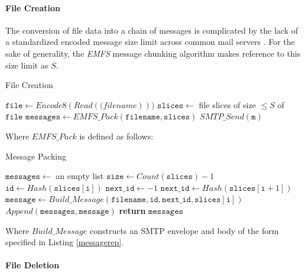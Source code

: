 \documentclass[12pt]{article}
\begin{document}
\paragraph{File Creation}

The conversion of file data into a chain of messages is complicated by the lack
of a standardized encoded message size limit across common mail servers
\cite{google:01, yahoo:01, microsoft:01}. For the sake of generality, the
\textit{EMFS} message chunking algorithm makes reference to this size limit as
$S$.

\begin{algorithm}
\caption{File Creation}
\begin{algorithmic}[1]
\State $\mathtt{file} \gets \mathit{Encode8}(\mathit{Read}(\mathtt(filename)))$
\State $\mathtt{slices} \gets$ file slices of size $\leq \mathit{S}$ of $\mathtt{file}$
\State $\mathtt{messages} \gets \mathit{EMFS\_Pack}(\mathtt{filename}, \mathtt{slices})$
\State $\mathit{SMTP\_Send}(\mathtt{m})$
\EndFor
\EndProcedure
\end{algorithmic}
\end{algorithm}

Where $\mathit{EMFS\_Pack}$ is defined as follows:

\begin{algorithm}
\caption{Message Packing}
\begin{algorithmic}[1]
\State $\mathtt{messages} \gets$ an empty list
\State $\mathtt{size} \gets \mathit{Count}(\mathtt{slices}) - 1$
\State $\mathtt{id} \gets \mathit{Hash}(\mathtt{slices}[\mathtt{i}])$
\State $\texttt{next\_id} \gets -1$
\State $\mathtt{next\_id} \gets \mathit{Hash}(\mathtt{slices}[\mathtt{i} + 1])$
\EndIf
\State $\mathtt{message} \gets \mathit{Build\_Message}(\mathtt{filename}, \mathtt{id}, \mathtt{next\_id}, \mathtt{slices}[\mathtt{i}])$
\State $\mathit{Append}(\mathtt{messages}, \mathtt{message})$
\EndFor
\State \textbf{return} $\mathtt{messages}$
\EndProcedure
\end{algorithmic}
\end{algorithm}

Where $\mathit{Build\_Message}$ constructs an SMTP envelope and body of the form
specified in Listing \ref{messagerep}.

\paragraph{File Deletion}
\end{document}
